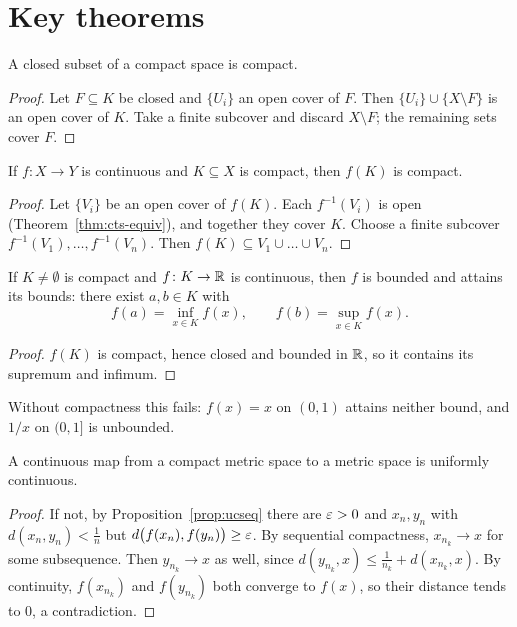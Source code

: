 \section{Key theorems}
\begin{theorem}\label{thm:closedsub}
A closed subset of a compact space is compact.
\end{theorem}
\begin{proof}
Let $F\subseteq K$ be closed and $\{U_i\}$ an open cover of $F$. Then $\{U_i\}\cup\{X\setminus F\}$ is an open cover of $K$. Take a finite subcover and discard $X\setminus F$; the remaining sets cover $F$.
\end{proof}

\begin{theorem}\label{thm:ctsimage}
If $f\colon X\to Y$ is continuous and $K\subseteq X$ is compact, then $f(K)$ is compact.
\end{theorem}
\begin{proof}
Let $\{V_i\}$ be an open cover of $f(K)$. Each $f^{-1}(V_i)$ is open (Theorem~\ref{thm:cts-equiv}), and together they cover $K$. Choose a finite subcover $f^{-1}(V_{1}),\dots,f^{-1}(V_{n})$. Then $f(K)\subseteq V_1\cup\dots\cup V_n$.
\end{proof}

\begin{corollary}\label{cor:evt}
If $K\ne\emptyset$ is compact and $f\colon K\to\mathbb{R}$ is continuous, then $f$ is bounded and attains its bounds: there exist $a,b\in K$ with
\[ f(a)=\inf_{x\in K}f(x),\qquad f(b)=\sup_{x\in K}f(x). \]
\end{corollary}
\begin{proof}
$f(K)$ is compact, hence closed and bounded in $\mathbb{R}$, so it contains its supremum and infimum.
\end{proof}
Without compactness this fails: $f(x)=x$ on $(0,1)$ attains neither bound, and $1/x$ on $(0,1]$ is unbounded.

\begin{theorem}\label{thm:heinecantor}
A continuous map from a compact metric space to a metric space is uniformly continuous.
\end{theorem}
\begin{proof}
If not, by Proposition~\ref{prop:ucseq} there are $\varepsilon>0$ and $x_n,y_n$ with $d(x_n,y_n)<\frac1n$ but $d\bigl(f(x_n),f(y_n)\bigr)\ge\varepsilon$. By sequential compactness, $x_{n_k}\to x$ for some subsequence. Then $y_{n_k}\to x$ as well, since $d(y_{n_k},x)\le\frac1{n_k}+d(x_{n_k},x)$. By continuity, $f(x_{n_k})$ and $f(y_{n_k})$ both converge to $f(x)$, so their distance tends to $0$, a contradiction.
\end{proof}

